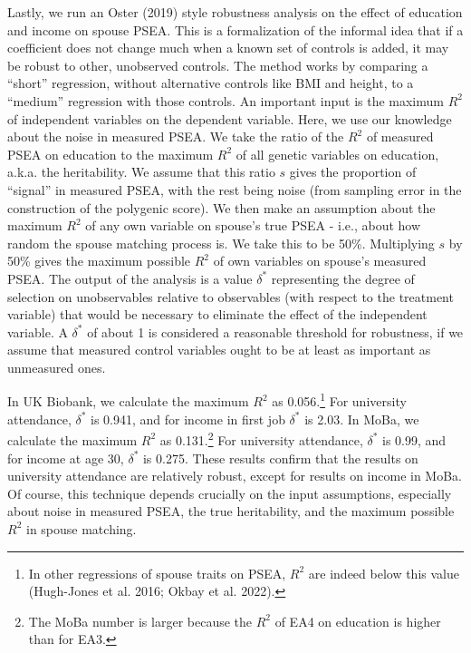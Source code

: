 \documentclass[
  12pt,
]{article}
\theoremstyle{definition}
\theoremstyle{definition}
\theoremstyle{definition}
\theoremstyle{definition}
\theoremstyle{remark}
\begin{document}
Lastly, we run an Oster (2019) style robustness analysis on the
effect of education and income on spouse PSEA. This is a formalization of the
informal idea that if a coefficient does not change much when a known set of
controls is added, it may be robust to other, unobserved controls. The method
works by comparing a ``short'' regression, without alternative controls like BMI
and height, to a ``medium'' regression with those controls. An important input is
the maximum \(R^2\) of independent variables on the dependent variable. Here,
we use our knowledge about the noise in measured PSEA. We take the ratio of
the \(R^2\) of measured PSEA on education to the maximum \(R^2\) of all genetic
variables on education, a.k.a. the heritability. We assume that this ratio
\(s\) gives the proportion of ``signal'' in measured PSEA, with the rest being
noise (from sampling error in the construction of the polygenic score). We then
make an assumption about the maximum \(R^2\) of any own variable on
spouse's true PSEA - i.e., about how random the spouse matching
process is. We take this to be 50\%. Multiplying \(s\) by 50\%
gives the maximum possible \(R^2\) of own variables on spouse's measured PSEA.
The output of the analysis is a value \(\delta^*\) representing the degree of
selection on unobservables relative to observables (with respect to the treatment
variable) that would be necessary to eliminate the effect of the independent
variable. A \(\delta^*\) of about 1 is considered a reasonable threshold for
robustness, if we assume that measured control variables ought to be at least as
important as unmeasured ones.

In UK Biobank, we calculate the maximum \(R^2\) as 0.056.\footnote{In other regressions of spouse traits on
  PSEA, \(R^2\) are indeed below this value (Hugh-Jones et al. 2016; Okbay et al. 2022).} For university
attendance, \(\delta^*\) is 0.941, and for income in first job
\(\delta^*\) is 2.03. In MoBa, we calculate the maximum \(R^2\) as
0.131.\footnote{The MoBa number is larger because the \(R^2\) of EA4 on education is
  higher than for EA3.} For university attendance, \(\delta^*\) is 0.99,
and for income at age 30, \(\delta^*\) is 0.275. These results
confirm that the results on university attendance are relatively robust, except
for results on income in MoBa. Of course, this technique depends crucially
on the input assumptions, especially about noise in measured PSEA, the true
heritability, and the maximum possible \(R^2\) in spouse matching.

\FloatBarrier
\end{document}
